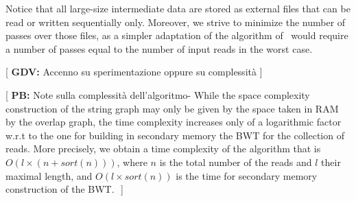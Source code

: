 \documentclass[runningheads,envcountsame,a4paper]{llncs}
\newcommand{\notaestesa}[2]{%
 \marginpar{\color{red!75!black}\textbf{\texttimes}}%
 {\color{red!75!black}%
 [\,\textbullet\,\textsf{\textbf{#1:}} %
 \textsf{\footnotesize#2}\,\textbullet\,]}%
}
\begin{document}
Notice that all large-size intermediate data are stored as external files that
can be read or written sequentially only.
Moreover, we strive to minimize the number of passes over those files, as a
simpler adaptation of the algorithm of~\cite{Bauer2011} would require a number
of passes equal to the number of input reads in the worst case.

\notaestesa{GDV}{ Accenno su sperimentazione oppure su complessità}
\notaestesa{PB}{
Note sulla complessità dell'algoritmo-
While the space complexity construction of the string graph may only be given by the space taken
in RAM by the overlap graph,  the time complexity increases only of a logarithmic factor w.r.t to the one for building
in secondary memory the BWT for the collection of reads.
More precisely, we obtain a time complexity of the algorithm that is $O(l \times (n + sort(n)))$, where $n$ is the total number  of the reads and $l$ their maximal length, and $O(l \times  sort(n))$
is the time for secondary memory construction of the BWT.
}





\begin{comment}
--------- non so dove vada-----------------


A key observation in our work is the fact that due to the fact that a
BWT consists of the symbols that precedes the lexicographic ordering of
suffixes of the reads of a collection, it is possible to "walk"
consecutively on the BWT of the collection of reads and of the reversed
version of the reads and then building a forward and backward extension
of a $Q$-substring by symbols of the alphabet lexicographically ordered.
All this can be done entirely using files for each symbol of the
alphabet and files for the BWT and its reversed version.
\end{comment}


\begin{comment}
descrizione The FM-index .... [inserire citazione FM-index]

With the advent of NGS data, the investigation of the BWT has moved
towards its use in indexing huge collections of texts, represented by
the reads of variable length.
The notion of Extended Borrows Wheeler has been proposed to deal with a
collection of texts~\cite{Bauer2011} and its potentiality in
Bioinformatics to index read data has been investigated in ....

While the BWT has been deeply used for the alignment of reads to a
reference genome, for the first time the BWT has been explored as a tool
for de novo assembly.

In~\cite{Simpson2010} Durbin addresses the problem of having a more
efficient space FM-index implementation of the string graph problem.

---results----

\end{comment}
\end{document}
